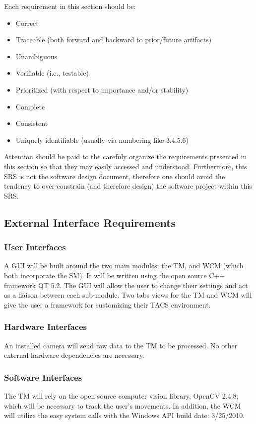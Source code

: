 \documentclass[titlepage]{article}
\begin{document}
Each requirement in this section should be:
\begin{itemize}
	\item Correct
	\item Traceable (both forward and backward to prior/future artifacts)
	\item Unambiguous
	\item Verifiable (i.e., testable)
	\item Prioritized (with respect to importance and/or stability)
	\item Complete
	\item Consistent
	\item Uniquely identifiable (usually via numbering like 3.4.5.6)
\end{itemize}

Attention should be paid to the carefuly organize the requirements presented in this section so that they may easily accessed and understood.  Furthermore, this SRS is not the software design document, therefore one should avoid the tendency to over-constrain (and therefore design) the software project within this SRS.

\subsection{External Interface Requirements}

\subsubsection{User Interfaces}
A GUI will be built around the two main modules; the TM, and WCM (which both incorporate the SM). It will be written using the open source C++ framework QT 5.2. The GUI will allow the user to change their settings and act as a liaison between each sub-module. Two tabs views for the TM and WCM will give the user a framework for customizing their TACS environment.

\subsubsection{Hardware Interfaces}
An installed camera will send raw data to the TM to be processed. No other external hardware dependencies are necessary.

\subsubsection{Software Interfaces}
The TM will rely on the open source computer vision library, OpenCV 2.4.8, which will be necessary to track the user's movements. In addition, the WCM will utilize the easy system calls with the Windows API build date: 3/25/2010.
\end{document}

